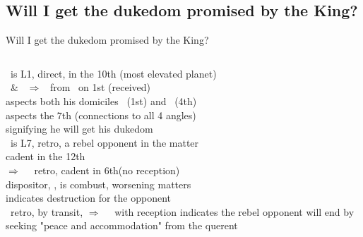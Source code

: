 \subsection{Will I get the dukedom promised by the King?}
\begin{frame}[t]{Will I get the dukedom promised by the King?}
\begin{columns}[T, onlytextwidth]
\Jupiter\ is L1, direct, in the 10th (most elevated planet) \\
\hspace{1em}\Sun\ \& \Venus\ $\Rightarrow$ \Square\ from \Sagittarius\ on 1st (received) \\
\hspace{1em}aspects both his domiciles \Sagittarius\ (1st) and \Pisces\ (4th) \\
\hspace{1em}aspects the 7th (connections to all 4 angles) \\
\hspace{1em}signifying he will get his dukedom\\
\vspace{0.5em}
\Mercury\ is L7, retro, a rebel opponent in the matter \\
\hspace{1em}cadent in the 12th \\
\hspace{1em}$\Rightarrow$ \Opposition\ \Saturn\ retro, cadent in 6th\footnotemark[1] (no reception) \\
\hspace{1em}dispositor, \Venus, is combust, worsening matters \\
\hspace{1em}indicates destruction for the opponent \\
\vspace{0.5em}
\Mercury\ retro, by transit, $\Rightarrow$ \Sextile\ \Jupiter\ with reception indicates the rebel opponent will end by seeking "peace and accommodation" from the querent


\end{columns}
\end{frame}
